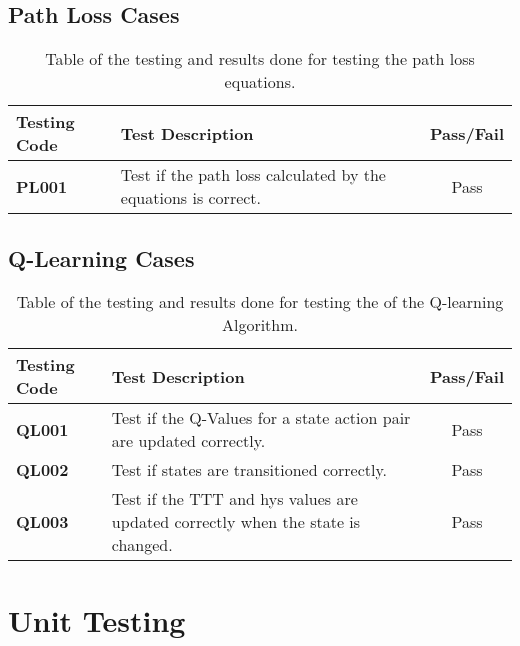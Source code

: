 \subsection{Path Loss Cases}
\begin{table}[H]
  \begin{center}
    \begin{tabular}{| l | p{8cm} | c |}
  	  \hline
      \textbf{Testing Code} & \textbf{Test Description} & \textbf{Pass/Fail} \\ \hline
      \textbf{PL001} & Test if the path loss calculated by the equations is correct. & Pass \\ \hline
  	\end{tabular}
  \end{center}
  \caption{Table of the testing and results done for testing the path loss equations.}
  \label{tab:test_pathloss}
\end{table}

\subsection{Q-Learning Cases}
\begin{table}[H]
  \begin{center}
    \begin{tabular}{| l | p{8cm} | c |}
  	  \hline
      \textbf{Testing Code} & \textbf{Test Description} & \textbf{Pass/Fail} \\ \hline
      \textbf{QL001} & Test if the Q-Values for a state action pair are updated correctly. & Pass \\ \hline
      \textbf{QL002} & Test if states are transitioned correctly. & Pass \\ \hline
   	  \textbf{QL003} & Test if the TTT and hys values are updated correctly when the state is changed. & Pass \\ \hline
  	\end{tabular}
  \end{center}
  \caption{Table of the testing and results done for testing the of the Q-learning Algorithm.}
  \label{tab:test_qlearning}
\end{table}

\section{Unit Testing}
